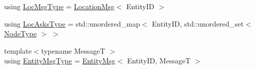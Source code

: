 \begin{DoxyCompactItemize}
\item 
using \hyperlink{structvt_1_1location_1_1_entity_location_coord_a8799cbd5fb0fb04cfdd1012fe1d5908f}{Loc\+Msg\+Type} = \hyperlink{structvt_1_1location_1_1_location_msg}{Location\+Msg}$<$ Entity\+ID $>$
\item 
using \hyperlink{structvt_1_1location_1_1_entity_location_coord_a492ca5404229c05923f69bae396f2ac4}{Loc\+Asks\+Type} = std\+::unordered\+\_\+map$<$ Entity\+ID, std\+::unordered\+\_\+set$<$ \hyperlink{namespacevt_a866da9d0efc19c0a1ce79e9e492f47e2}{Node\+Type} $>$ $>$
\item 
{\footnotesize template$<$typename MessageT $>$ }\\using \hyperlink{structvt_1_1location_1_1_entity_location_coord_a69e037fef241a04659b4068c8ae1513f}{Entity\+Msg\+Type} = \hyperlink{structvt_1_1location_1_1_entity_msg}{Entity\+Msg}$<$ Entity\+ID, MessageT $>$
\end{DoxyCompactItemize}

